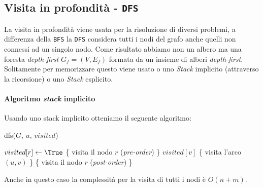     \subsection{Visita in profondità - \texttt{DFS}}
        La visita in profondità viene usata per la risoluzione di diversi problemi, a differenza della \texttt{BFS} la \texttt{DFS} considera tutti i nodi del grafo anche quelli non connessi ad un singolo nodo. Come risultato abbiamo non un albero ma una foresta \textit{depth-first} $G_f=(V,E_f)$ formata da un insieme di alberi \textit{depth-first}. Solitamente per memorizzare questo viene usato o uno \textit{Stack} implicito (attraverso la ricorsione) o uno \textit{Stack} esplicito.
        \paragraph{Algoritmo \textit{stack} implicito } Usando uno stack implicito otteniamo il seguente algoritmo:
        \begin{algorithm}
            \caption{dfs(\Graph $G$, \Node $u$, \Bool[] $visited$)}
            \begin{algorithmic}
                \State $ visited[r] \gets \True $
                \State \{ visita il nodo $ r $ (\textit{pre-order}) \}
                    \If \Not $ visited[v] $
                        \State \{ visita l'arco $ (u,v) $ \}
                        \State {}
                    \EndIf
                \EndFor
                \State \{ visita il nodo $ r $ (\textit{post-order}) \}
            \end{algorithmic}
        \end{algorithm}
        Anche in questo caso la complessità per la visita di tutti i nodi è $O(n+m)$.
